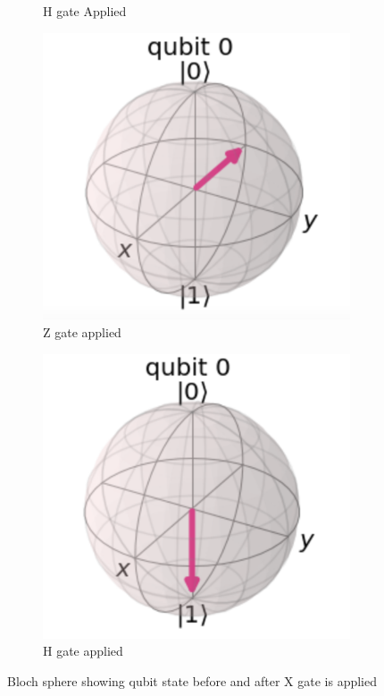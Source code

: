 \begin{figure}[h]
\begin{subfigure}[h]{0.24\textwidth}
        \caption{H gate Applied}
        \label{fig:hzhGate2}
    \end{subfigure}
        \begin{subfigure}[h]{0.24\textwidth}
        \centering
        \includegraphics[width=\textwidth]{lab2/hzhGate3.png}
        \caption{Z gate applied}
        \label{fig:hzhGate3}
    \end{subfigure}
        \begin{subfigure}[h]{0.24\textwidth}
        \centering
        \includegraphics[width=\textwidth]{lab2/hzhGate4.png}
        \caption{H gate applied}
        \label{fig:hzhGate4}
    \end{subfigure}
    \caption{Bloch sphere showing qubit state before and after X gate is applied} 
    \label{fig:bSphereHZHGate}
\end{figure}

